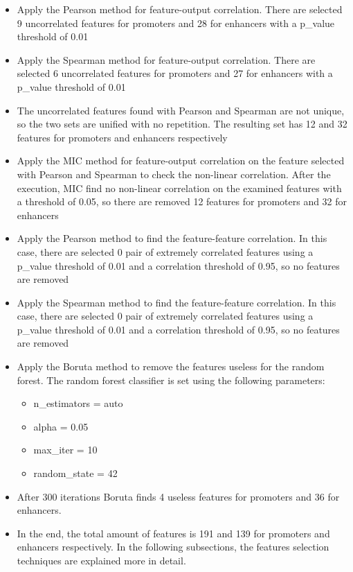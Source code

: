 \begin{itemize}
\item
  Apply the Pearson method for feature-output correlation. There are
  selected 9 uncorrelated features for promoters and 28 for enhancers
  with a p\_value threshold of 0.01
\item
  Apply the Spearman method for feature-output correlation. There are
  selected 6 uncorrelated features for promoters and 27 for enhancers
  with a p\_value threshold of 0.01
\item
  The uncorrelated features found with Pearson and Spearman are not
  unique, so the two sets are unified with no repetition. The resulting
  set has 12 and 32 features for promoters and enhancers respectively
\item
  Apply the MIC method for feature-output correlation on the feature
  selected with Pearson and Spearman to check the non-linear
  correlation. After the execution, MIC find no non-linear correlation
  on the examined features with a threshold of 0.05, so there are
  removed 12 features for promoters and 32 for enhancers
\item
  Apply the Pearson method to find the feature-feature correlation. In
  this case, there are selected 0 pair of extremely correlated features
  using a p\_value threshold of 0.01 and a correlation threshold of
  0.95, so no features are removed
\item
  Apply the Spearman method to find the feature-feature correlation. In
  this case, there are selected 0 pair of extremely correlated features
  using a p\_value threshold of 0.01 and a correlation threshold of
  0.95, so no features are removed
\item
  Apply the Boruta method to remove the features useless for the random
  forest. The random forest classifier is set using the following
  parameters:

  \begin{itemize}
  \item
    n\_estimators = auto
  \item
    alpha = 0.05
  \item
    max\_iter = 10
  \item
    random\_state = 42
  \end{itemize}
\item
  After 300 iterations Boruta finds 4 useless features for promoters and
  36 for enhancers.
\item
  In the end, the total amount of features is 191 and 139 for promoters
  and enhancers respectively. In the following subsections, the features
  selection techniques are explained more in detail. 
\end{itemize}

